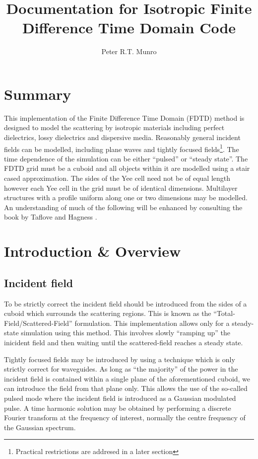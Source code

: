 \documentclass[a4paper, 12pt]{article}
\author{Peter R.T. Munro}
\title{Documentation for Isotropic Finite Difference Time Domain Code}
\begin{document}
	
	\maketitle\tableofcontents
	\section{Summary}
	This implementation of the Finite Difference Time Domain (FDTD) method is designed to model the scattering by isotropic materials
	including perfect dielectrics, lossy dielectrics and dispersive
	media. Reasonably general incident fields can be modelled, including
	plane waves and tightly focused fields\footnote{Practical restrictions
		are addresed in a later section}. The time dependence of the
	simulation can be either ``pulsed'' or ``steady state''. The FDTD grid must be a cuboid
	and all objects within it are modelled using a stair cased
	approximation. The sides of the Yee cell need not be of equal length
	however each Yee cell in the grid must be of identical
	dimensions. Multilayer structures with a profile uniform along one or
	two dimensions may be modelled. An understanding of much of the
	following will be enhanced by consulting the book by Taflove and
	Hagness \cite{taflove00book}.

	\section{Introduction \& Overview}
	\subsection{Incident field}
	To be strictly correct the incident field should be introduced from
	the sides of a cuboid which surrounds the scattering regions. This is
	known as the ``Total-Field/Scattered-Field'' formulation. This
	implementation allows only for a steady-state simulation using this
	method. This involves slowly ``ramping up'' the inicident field and
	then waiting until the scattered-field reaches a steady state.

	Tightly focused fields may be introduced by using a technique which is
	only strictly correct for waveguides. As long as ``the majority'' of
	the power in the incident field is contained within a single plane of
	the aforementioned cuboid, we can introduce the field from that plane
	only. This allows the use of the so-called pulsed mode where the
	incident field is introduced as a Gaussian modulated pulse. A time
	harmonic solution may be obtained by performing a discrete Fourier
	transform at the frequency of interest, normally the centre frequency
	of the Gaussian spectrum.
\end{document}
